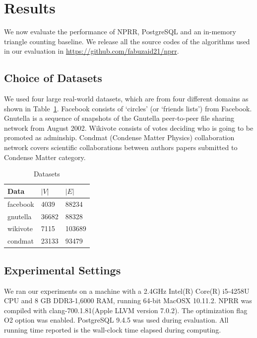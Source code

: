 \section{Results}

We now evaluate the performance of NPRR, PostgreSQL and an in-memory triangle counting baseline. We release all the source codes of the algorithms used in our evaluation in \url{https://github.com/fabuzaid21/nprr}.


\subsection{Choice of Datasets} 

We used four large real-world datasets, which are from four different domains as shown in Table~\ref{datasets}. Facebook consists of `circles' (or `friends lists') from Facebook. Gnutella is a sequence of snapshots of the Gnutella peer-to-peer file sharing network from August 2002. Wikivote consists of votes deciding who is going to  be promoted as adminship. Condmat (Condense Matter Physics) collaboration network covers scientific collaborations between authors papers submitted to Condense Matter category. 


\begin{table}[!h]
\centering

\begin{tabular}{l|l|l}
Data & $|V|$ & $|E|$ \\
\hline
facebook & 4039 & 88234  \\
\hline
gnutella & 36682 & 88328 \\
\hline
wikivote & 7115 & 103689 \\
\hline
condmat & 23133 & 93479 \\
\hline
\end{tabular}
\caption{Datasets}
\label{datasets}
\end{table}



\subsection{Experimental Settings} 

We ran our experiments on a machine with a 2.4GHz Intel(R) Core(R) i5-4258U CPU and 8 GB DDR3-1,6000 RAM, running 64-bit MacOSX 10.11.2. NPRR was compiled with clang-700.1.81(Apple LLVM version 7.0.2). The optimization flag O2 option was enabled. PostgreSQL 9.4.5 was used during evaluation. All running time reported is the wall-clock time elapsed during computing.

